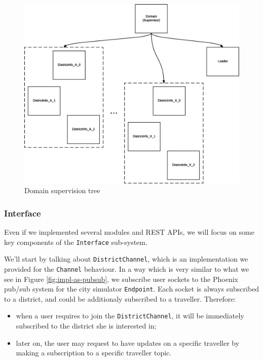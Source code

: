\begin{figure}[H]
  \centering
  \includegraphics[width=\columnwidth]{images/implementation/as-domain.eps}
  \caption{Domain supervision tree}
  \label{fig:impl-as-domain}
\end{figure}

\subsubsection{Interface}

Even if we implemented several modules and REST APIs, we will focus on some
key components of the \texttt{Interface} sub-system.

We'll start by talking about \texttt{DistrictChannel}, which is an
implementation we provided for the \texttt{Channel} behaviour. In a way which
is very similar to what we see in Figure \ref{fig:impl-as-pubsub}, we subscribe
user sockets to the Phoenix pub/sub system for the city simulator
\texttt{Endpoint}.
Each socket is always subscribed to a district, and could be additionaly
subscribed to a traveller. Therefore:

\begin{itemize}
  \item when a user requires to join the \texttt{DistrictChannel}, it will
    be immediately subscribed to the district she is interested in;
  \item later on, the user may request to have updates on a specific traveller
    by making a subscription to a specific traveller topic.
\end{itemize}

